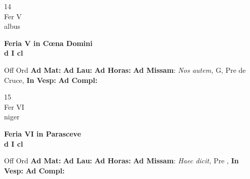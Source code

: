 \documentclass[10pt, openany]{book}
\begin{document}
        \begin{center}
            \begin{minipage}{3.5in}
                \vspace{2em}
                \begin{minipage}{0.5in}
                    {\Huge 14} \\
                    {\normalsize Fer V} \\
                    {\normalsize albus}
                \end{minipage}
                \begin{minipage}{3.0in}
                    \textbf{ \large Feria V in Cœna Domini \\
                    \textnormal{\normalsize d I cl}} \\ 
                \end{minipage}
                \begin{justify}Off Ord
                    \textbf{Ad Mat: }
                    \textbf{Ad Lau: }
                    \textbf{Ad Horas: }\textbf{Ad Missam}: \textit{Nos autem,} G, Pre de Cruce,  
                    \textbf{In Vesp: }
                    \textbf{Ad Compl: }
                \end{justify}
            \end{minipage}
        \end{center}
    
        \begin{center}
            \begin{minipage}{3.5in}
                \vspace{2em}
                \begin{minipage}{0.5in}
                    {\Huge 15} \\
                    {\normalsize Fer VI} \\
                    {\normalsize niger}
                \end{minipage}
                \begin{minipage}{3.0in}
                    \textbf{ \large Feria VI in Parasceve \\
                    \textnormal{\normalsize d I cl}} \\ 
                \end{minipage}
                \begin{justify}Off Ord
                    \textbf{Ad Mat: }
                    \textbf{Ad Lau: }
                    \textbf{Ad Horas: }\textbf{Ad Missam}: \textit{Haec dicit,} Pre ,  
                    \textbf{In Vesp: }
                    \textbf{Ad Compl: }
                \end{justify}
            \end{minipage}
        \end{center}
    
\end{document}
